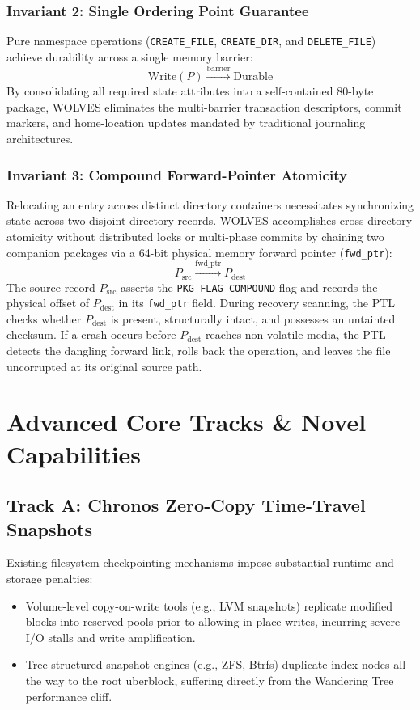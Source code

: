 \documentclass[conference]{IEEEtran}
\begin{document}
\subsubsection{Invariant 2: Single Ordering Point Guarantee}
Pure namespace operations (\texttt{CREATE\_FILE}, \texttt{CREATE\_DIR}, and \texttt{DELETE\_FILE}) achieve durability across a single memory barrier:
\begin{equation}
    \text{Write}(P) \xrightarrow{\text{barrier}} \text{Durable}
\end{equation}
By consolidating all required state attributes into a self-contained 80-byte package, WOLVES eliminates the multi-barrier transaction descriptors, commit markers, and home-location updates mandated by traditional journaling architectures.

\subsubsection{Invariant 3: Compound Forward-Pointer Atomicity}
Relocating an entry across distinct directory containers necessitates synchronizing state across two disjoint directory records. WOLVES accomplishes cross-directory atomicity without distributed locks or multi-phase commits by chaining two companion packages via a 64-bit physical memory forward pointer (\texttt{fwd\_ptr}):
\begin{equation}
    P_{\text{src}} \xrightarrow{\text{fwd\_ptr}} P_{\text{dest}}
\end{equation}
The source record $P_{\text{src}}$ asserts the \texttt{PKG\_FLAG\_COMPOUND} flag and records the physical offset of $P_{\text{dest}}$ in its \texttt{fwd\_ptr} field. During recovery scanning, the PTL checks whether $P_{\text{dest}}$ is present, structurally intact, and possesses an untainted checksum. If a crash occurs before $P_{\text{dest}}$ reaches non-volatile media, the PTL detects the dangling forward link, rolls back the operation, and leaves the file uncorrupted at its original source path.

\section{Advanced Core Tracks \& Novel Capabilities}

\subsection{Track A: Chronos Zero-Copy Time-Travel Snapshots}
Existing filesystem checkpointing mechanisms impose substantial runtime and storage penalties:
\begin{itemize}
    \item Volume-level copy-on-write tools (e.g., LVM snapshots) replicate modified blocks into reserved pools prior to allowing in-place writes, incurring severe I/O stalls and write amplification.
    \item Tree-structured snapshot engines (e.g., ZFS, Btrfs) duplicate index nodes all the way to the root uberblock, suffering directly from the Wandering Tree performance cliff.
\end{itemize}
\end{document}
